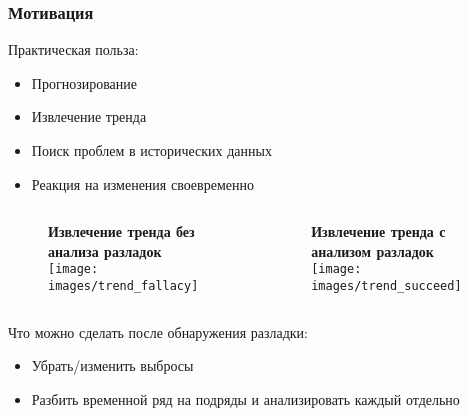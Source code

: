 \documentclass[intlimits, 9pt, unicode]{beamer}
\begin{document}
\begin{frame}
    \frametitle{Мотивация}
Практическая польза:
    \begin{itemize}
    	\item Прогнозирование
	\item Извлечение тренда
    	\item Поиск проблем в исторических данных
	\item Реакция на изменения своевременно
    \end{itemize}


   \begin{columns}
        \begin{column}{5cm}
	\begin{figure}
		\textbf{Извлечение тренда без анализа разладок}
		\texttt{[image: images/trend\_fallacy]}
	\end{figure}
        \end{column}

        \begin{column}{5cm}
	\begin{figure}
		\textbf{Извлечение тренда с анализом разладок}
		\texttt{[image: images/trend\_succeed]}
	\end{figure}
        \end{column}
    \end{columns}

Что можно сделать после обнаружения разладки:
    \begin{itemize}
    	\item Убрать/изменить выбросы
	\item Разбить временной ряд на подряды и анализировать каждый отдельно
    \end{itemize}

\end{frame}
\end{document}
